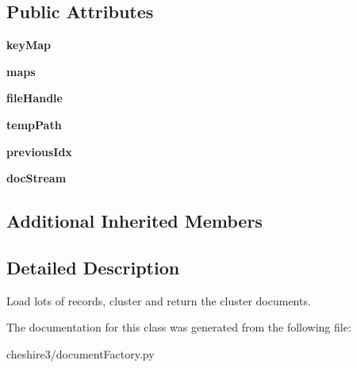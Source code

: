 \subsection*{Public Attributes}
\begin{DoxyCompactItemize}
\item 
\hypertarget{classcheshire3_1_1document_factory_1_1_cluster_extraction_document_factory_accbff102f63a18ecbdaf9b48c09b63fb}{{\bfseries key\-Map}}\label{classcheshire3_1_1document_factory_1_1_cluster_extraction_document_factory_accbff102f63a18ecbdaf9b48c09b63fb}

\item 
\hypertarget{classcheshire3_1_1document_factory_1_1_cluster_extraction_document_factory_ab53935bb86bf52711026949ee9ad97a6}{{\bfseries maps}}\label{classcheshire3_1_1document_factory_1_1_cluster_extraction_document_factory_ab53935bb86bf52711026949ee9ad97a6}

\item 
\hypertarget{classcheshire3_1_1document_factory_1_1_cluster_extraction_document_factory_a304b329d62be60667d4678bd69398676}{{\bfseries file\-Handle}}\label{classcheshire3_1_1document_factory_1_1_cluster_extraction_document_factory_a304b329d62be60667d4678bd69398676}

\item 
\hypertarget{classcheshire3_1_1document_factory_1_1_cluster_extraction_document_factory_aab180143b0a69561d75d4fa7cd6c3572}{{\bfseries temp\-Path}}\label{classcheshire3_1_1document_factory_1_1_cluster_extraction_document_factory_aab180143b0a69561d75d4fa7cd6c3572}

\item 
\hypertarget{classcheshire3_1_1document_factory_1_1_cluster_extraction_document_factory_a503781ab2d719c39601f6e3f62bfeb45}{{\bfseries previous\-Idx}}\label{classcheshire3_1_1document_factory_1_1_cluster_extraction_document_factory_a503781ab2d719c39601f6e3f62bfeb45}

\item 
\hypertarget{classcheshire3_1_1document_factory_1_1_cluster_extraction_document_factory_aeac7761e74f6ea60afdd5f330f17d411}{{\bfseries doc\-Stream}}\label{classcheshire3_1_1document_factory_1_1_cluster_extraction_document_factory_aeac7761e74f6ea60afdd5f330f17d411}

\end{DoxyCompactItemize}
\subsection*{Additional Inherited Members}


\subsection{Detailed Description}
\begin{DoxyVerb}Load lots of records, cluster and return the cluster documents.\end{DoxyVerb}
 

The documentation for this class was generated from the following file\-:\begin{DoxyCompactItemize}
\item 
cheshire3/document\-Factory.\-py\end{DoxyCompactItemize}
